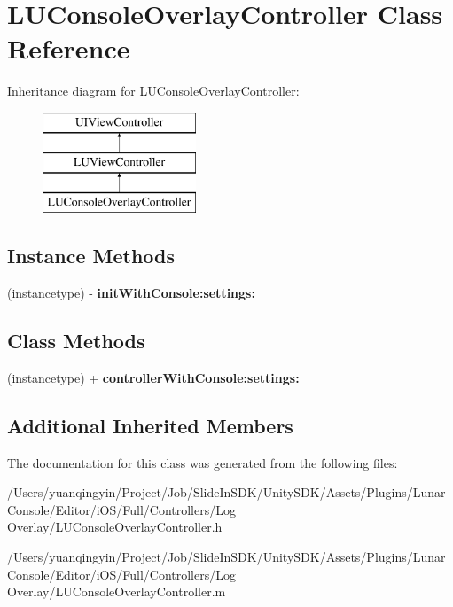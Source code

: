 \hypertarget{interface_l_u_console_overlay_controller}{}\section{L\+U\+Console\+Overlay\+Controller Class Reference}
\label{interface_l_u_console_overlay_controller}
Inheritance diagram for L\+U\+Console\+Overlay\+Controller\+:\begin{figure}[H]
\begin{center}
\leavevmode
\includegraphics[height=3.000000cm]{interface_l_u_console_overlay_controller}
\end{center}
\end{figure}
\subsection*{Instance Methods}
\begin{DoxyCompactItemize}
\item 
\mbox{\label{interface_l_u_console_overlay_controller_af5d849c1411885c8bf349285c38e2d0a}} 
(instancetype) -\/ {\bfseries init\+With\+Console\+:settings\+:}
\end{DoxyCompactItemize}
\subsection*{Class Methods}
\begin{DoxyCompactItemize}
\item 
\mbox{\label{interface_l_u_console_overlay_controller_a14e2f7f798164d91ced2f91d1135477a}} 
(instancetype) + {\bfseries controller\+With\+Console\+:settings\+:}
\end{DoxyCompactItemize}
\subsection*{Additional Inherited Members}


The documentation for this class was generated from the following files\+:\begin{DoxyCompactItemize}
\item 
/\+Users/yuanqingyin/\+Project/\+Job/\+Slide\+In\+S\+D\+K/\+Unity\+S\+D\+K/\+Assets/\+Plugins/\+Lunar\+Console/\+Editor/i\+O\+S/\+Full/\+Controllers/\+Log Overlay/L\+U\+Console\+Overlay\+Controller.\+h\item 
/\+Users/yuanqingyin/\+Project/\+Job/\+Slide\+In\+S\+D\+K/\+Unity\+S\+D\+K/\+Assets/\+Plugins/\+Lunar\+Console/\+Editor/i\+O\+S/\+Full/\+Controllers/\+Log Overlay/L\+U\+Console\+Overlay\+Controller.\+m\end{DoxyCompactItemize}
